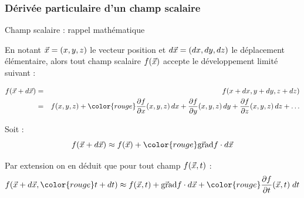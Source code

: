 \subsubsection{Dérivée particulaire d'un champ scalaire}
\begin{frame}{Champ scalaire : rappel mathématique}

\small

En notant $\vec{x} = (x, y, z)$ le vecteur position 
et $d\vec{x} = (dx, dy, dz)$ le déplacement élémentaire,
alors tout champ scalaire $f(\vec{x})$ accepte le développement limité suivant :

\begin{eqnarray*}
f(\myvec{x} + d\myvec{x}) & = & f(x+dx, y+dy, z+dz)
\\
& = & f(x, y, z) + {\color{rouge}\dpdx{f}(x, y, z)\,dx + \dpdy{f}(x, y, z)\, dy + \dpdz{f}(x, y, z)\, dz} + \ldots 
\end{eqnarray*}

Soit :
\[
	f(\myvec{x} + d\myvec{x}) \approx f(\myvec{x}) + {\color{rouge}\gradient f \cdot d\myvec{x}}
\]

\bigskip

\pause

Par extension on en déduit que pour tout champ $f(\vec{x}, t)$ :
\[
	f(\myvec{x} + d\myvec{x}, {\color{rouge}t+dt}) \approx f(\myvec{x}, t) + \gradient f \cdot d\myvec{x}
	+ {\color{rouge} \dpdt{f}(\myvec{x}, t) \; dt} 
\]


\vspace{20mm}

\end{frame}

